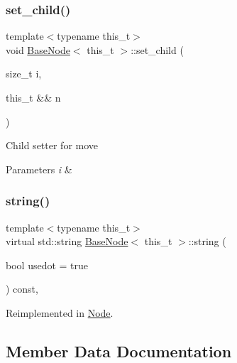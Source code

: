\subsubsection{\texorpdfstring{set\+\_\+child()}{set\_child()}\hspace{0.1cm}{\footnotesize\ttfamily [2/2]}}
{\footnotesize\ttfamily template$<$typename this\+\_\+t$>$ \\
void \hyperlink{class_base_node}{Base\+Node}$<$ this\+\_\+t $>$\+::set\+\_\+child (\begin{DoxyParamCaption}\item[{size\+\_\+t}]{i,  }\item[{this\+\_\+t \&\&}]{n }\end{DoxyParamCaption})\hspace{0.3cm}{\ttfamily [inline]}}

Child setter for move 
\begin{DoxyParams}{Parameters}
{\em i} & \\
\hline
\end{DoxyParams}
\mbox{\label{class_base_node_a079dae7bec84f4de8eef6d6cb9368a22}} 
\subsubsection{\texorpdfstring{string()}{string()}}
{\footnotesize\ttfamily template$<$typename this\+\_\+t$>$ \\
virtual std\+::string \hyperlink{class_base_node}{Base\+Node}$<$ this\+\_\+t $>$\+::string (\begin{DoxyParamCaption}\item[{bool}]{usedot = {\ttfamily true} }\end{DoxyParamCaption}) const\hspace{0.3cm}{\ttfamily [inline]}, {\ttfamily [virtual]}}



Reimplemented in \hyperlink{class_node_a5d2a0e17dd2a00a79e6d1f763c9114d0}{Node}.



\subsection{Member Data Documentation}
\mbox{\label{class_base_node_af2f245862083d173c950fca048c03546}} 
